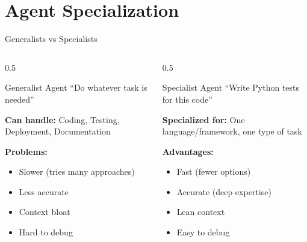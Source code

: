 \documentclass[aspectratio=169, 11pt]{beamer}
\begin{document}
\section{Agent Specialization}

\begin{frame}{Generalists vs Specialists}
    \begin{columns}[T]
        \begin{column}{0.5\textwidth}
            \begin{block}{Generalist Agent}
                ``Do whatever task is needed''
                \vspace{0.2cm}

                \textbf{Can handle:} Coding, Testing, Deployment, Documentation

                \vspace{0.2cm}
                \textbf{Problems:}
                \begin{itemize}
                    \item[\textcolor{UofSCRose}{$\times$}] Slower (tries many approaches)
                    \item[\textcolor{UofSCRose}{$\times$}] Less accurate
                    \item[\textcolor{UofSCRose}{$\times$}] Context bloat
                    \item[\textcolor{UofSCRose}{$\times$}] Hard to debug
                \end{itemize}
            \end{block}
        \end{column}
        \begin{column}{0.5\textwidth}
            \begin{exampleblock}{Specialist Agent}
                ``Write Python tests for this code''
                \vspace{0.2cm}

                \textbf{Specialized for:} One language/framework, one type of task

                \vspace{0.2cm}
                \textbf{Advantages:}
                \begin{itemize}
                    \item[\textcolor{UofSCHorseshoe}{\checkmark}] Fast (fewer options)
                    \item[\textcolor{UofSCHorseshoe}{\checkmark}] Accurate (deep expertise)
                    \item[\textcolor{UofSCHorseshoe}{\checkmark}] Lean context
                    \item[\textcolor{UofSCHorseshoe}{\checkmark}] Easy to debug
                \end{itemize}
            \end{exampleblock}
        \end{column}
    \end{columns}


\end{frame}
\end{document}
